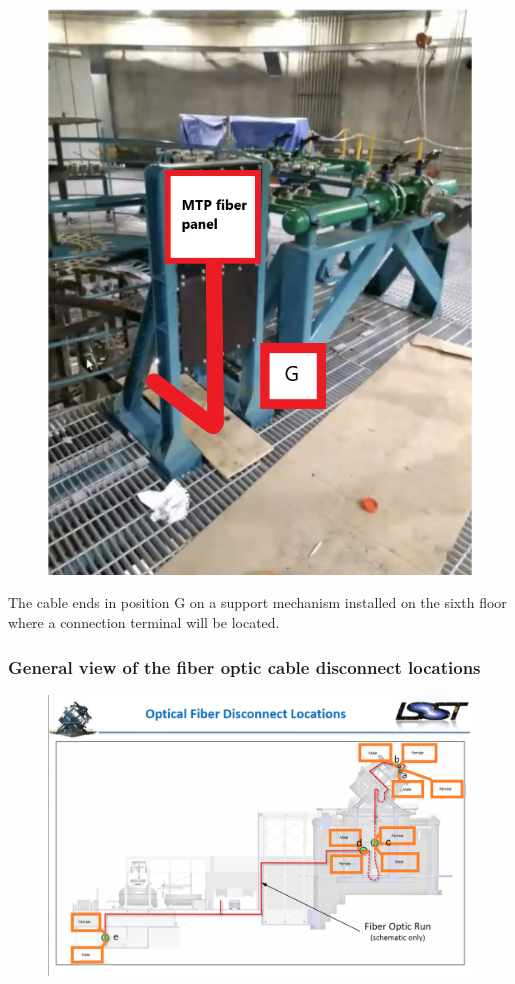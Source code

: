 \begin{figure}
  \includegraphics[width=\textwidth]{images/21.png}
  \label{fig:jlsimon}
\end{figure}

The cable ends in position G on a support mechanism installed on the sixth floor where a connection terminal will be located.


\subsubsection{General view of the fiber optic cable disconnect locations}

\begin{figure}
  \includegraphics[width=\textwidth]{images/22.png}
  \label{fig:jlsimon}
\end{figure}


